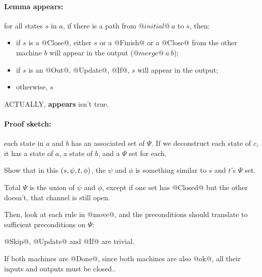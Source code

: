 \paragraph{Lemma appears:} for all states $s$ in $a$, if there is a path from $@initial@~a$ to $s$, then:
\begin{itemize}
\item if $s$ is a @Close@, either $s$ or a @Finish@ or a @Close@ from the other machine $b$ will appear in the output ($@merge@~a~b$);
\item if $s$ is an @Out@, @Update@, @If@, $s$ will appear in the output;
\item otherwise, $s$ 
\end{itemize}
ACTUALLY, \textbf{appears} isn't true.


\paragraph{Proof sketch:} each state in $a$ and $b$ has an associated set of $\Psi$.
If we deconstruct each state of $c$, it has a state of $a$, a state of $b$, and a $\Psi$ set for each.

Show that in this $(s,\psi,t,\phi)$, the $\psi$ and $\phi$ is something similar to $s$ and $t$'s $\Psi$ set.

Total $\Psi$ is the union of $\psi$ and $\phi$, except if one set has @Closed@ but the other doesn't, that channel is still open.

Then, look at each rule in @move@, and the preconditions should translate to sufficient preconditions on $\Psi$:

@Skip@, @Update@ and @If@ are trivial.

If both machines are @Done@, since both machines are also @ok@, all their inputs and outputs must be closed..




